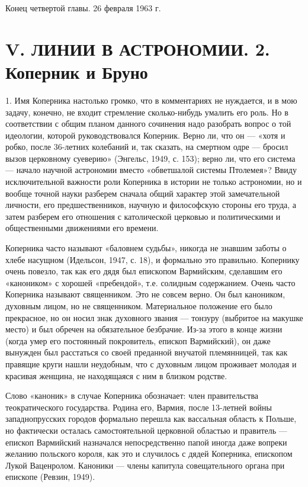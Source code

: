 \begin{flushright}
        Конец четвертой главы. 26 февраля 1963 г.
\end{flushright}

\clearpage

\section{V. ЛИНИИ В АСТРОНОМИИ. 2. Коперник и Бруно}

1. Имя Коперника настолько громко, что в комментариях не нуждается, и
в мою задачу, конечно, не входит стремление сколько-нибудь умалить его
роль. Но в соответствии с общим планом данного сочинения надо
разобрать вопрос о той идеологии, которой руководствовался Коперник.
Верно ли, что он --- «хотя и робко, после 36-летних колебаний и, так
сказать, на смертном одре --- бросил вызов церковному суеверию»
(Энгельс, 1949, с. 153); верно ли, что его система --- начало научной
астрономии вместо «обветшалой системы Птолемея»? Ввиду исключительной
важности роли Коперника в истории не только астрономии, но и вообще
точной науки разберем сначала общий характер этой замечательной
личности, его предшественников, научную и философскую стороны его
труда, а затем разберем его отношения с католической церковью и
политическими и общественными движениями его времени.

Коперника часто называют «баловнем судьбы», никогда не знавшим заботы
о хлебе насущном (Идельсон, 1947, с. 18), и формально это правильно.
Копернику очень повезло, так как его дядя был епископом Вармийским,
сделавшим его «каноником» с хорошей «пребендой», т.е. солидным
содержанием. Очень часто Коперника называют священником. Это не совсем
верно. Он был каноником, духовным лицом, но не священником.
Материальное положение его было прекрасное, но он носил знак духовного
звания --- тонзуру (выбритое на макушке место) и был обречен на
обязательное безбрачие. Из-за этого в конце жизни (когда умер его
постоянный покровитель, епископ Вармийский), он даже вынужден был
расстаться со своей преданной внучатой племянницей, так как правящие
круги нашли неудобным, что с духовным лицом проживает молодая и
красивая женщина, не находящаяся с ним в близком родстве.

Слово «каноник» в случае Коперника обозначает: член правительства
теократического государства. Родина его, Вармия, после 13-летней войны
западнопрусских городов формально перешла как вассальная область к
Польше, но фактически осталась самостоятельной церковной областью и
правитель --- епископ Вармийский назначался непосредственно папой
иногда даже вопреки желанию польского короля, как это и случилось с
дядей Коперника, епископом Лукой Ваценролом. Каноники --- члены
капитула совещательного органа при епископе (Ревзин, 1949).

